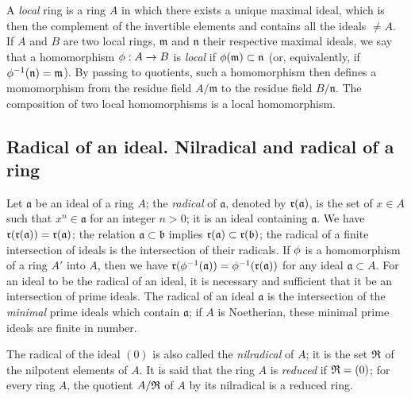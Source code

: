 \begin{env}[1.0.7]
\label{env-0.1.0.7}
A {\em local} ring is a ring $A$ in which there exists a unique maximal ideal,
which is then the complement of the invertible elements and contains all the
ideals $\neq A$. If $A$ and $B$ are two local rings, $\mathfrak{m}$ and
$\mathfrak{n}$ their respective maximal ideals, we say that a homomorphism
$\phi:A\to B$ is {\em local} if $\phi(\mathfrak{m})\subset\mathfrak{n}$ (or,
equivalently, if $\phi^{-1}(\mathfrak{n})=\mathfrak{m}$). By passing to
quotients, such a homomorphism then defines a momomorphism from the residue
field $A/\mathfrak{m}$ to the residue field $B/\mathfrak{n}$. The composition of
two local homomorphisms is a local homomorphism.
\end{env}

\subsection{Radical of an ideal. Nilradical and radical of a ring}
\label{subsection-radical-and-nilradical}

\begin{env}[1.1.1]
\label{env-0.1.1.1}
Let $\mathfrak{a}$ be an ideal of a ring $A$; the {\em radical} of
$\mathfrak{a}$, denoted by $\mathfrak{r}(\mathfrak{a})$, is the set of $x\in A$ such
that $x^n\in\mathfrak{a}$ for an integer $n>0$; it is an ideal containing
$\mathfrak{a}$. We have $\mathfrak{r}(\mathfrak{r}(\mathfrak{a}))=\mathfrak{r}(\mathfrak{a})$;
the relation $\mathfrak{a}\subset\mathfrak{b}$ implies
$\mathfrak{r}(\mathfrak{a})\subset\mathfrak{r}(\mathfrak{b})$; the radical of a finite
intersection of ideals is the intersection of their radicals. If $\phi$ is a
homomorphism of a ring $A'$ into $A$, then we have
$\mathfrak{r}(\phi^{-1}(\mathfrak{a}))=\phi^{-1}(\mathfrak{r}(\mathfrak{a}))$ for any ideal
$\mathfrak{a}\subset A$. For an ideal to be the radical of an ideal, it is
necessary and sufficient that it be an intersection of prime ideals. The radical
of an ideal $\mathfrak{a}$ is the intersection of the {\em minimal} prime
ideals which contain $\mathfrak{a}$; if $A$ is Noetherian, these minimal prime
ideals are finite in number.

The radical of the ideal $(0)$ is also called the {\em nilradical} of $A$; it
is the set $\mathfrak{R}$ of the nilpotent elements of $A$. It is said that the ring
$A$ is {\em reduced} if $\mathfrak{R}=(0)$; for every ring $A$, the quotient
$A/\mathfrak{R}$ of $A$ by its nilradical is a reduced ring.
\end{env}

